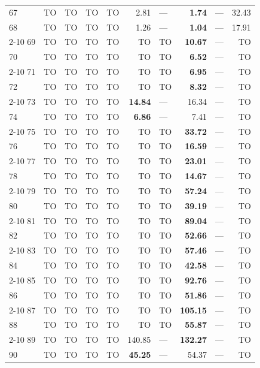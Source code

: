 \begin{longtable}{lr@{\hskip 4pt}l@{\hskip 12pt}r@{\hskip 4pt}l@{\hskip 12pt}r@{\hskip 4pt}l@{\hskip 12pt}r@{\hskip 4pt}l@{\hskip 12pt}r}
67 & TO & TO & TO & TO & 2.81 & --- & \textbf{1.74} & --- & 32.43 \\
68 & TO & TO & TO & TO & 1.26 & --- & \textbf{1.04} & --- & 17.91 \\
\cmidrule{2-10}
69 & TO & TO & TO & TO & TO & TO & \textbf{10.67} & --- & TO \\
70 & TO & TO & TO & TO & TO & TO & \textbf{6.52} & --- & TO \\
\cmidrule{2-10}
71 & TO & TO & TO & TO & TO & TO & \textbf{6.95} & --- & TO \\
72 & TO & TO & TO & TO & TO & TO & \textbf{8.32} & --- & TO \\
\cmidrule{2-10}
73 & TO & TO & TO & TO & \textbf{14.84} & --- & 16.34 & --- & TO \\
74 & TO & TO & TO & TO & \textbf{6.86} & --- & 7.41 & --- & TO \\
\cmidrule{2-10}
75 & TO & TO & TO & TO & TO & TO & \textbf{33.72} & --- & TO \\
76 & TO & TO & TO & TO & TO & TO & \textbf{16.59} & --- & TO \\
\cmidrule{2-10}
77 & TO & TO & TO & TO & TO & TO & \textbf{23.01} & --- & TO \\
78 & TO & TO & TO & TO & TO & TO & \textbf{14.67} & --- & TO \\
\cmidrule{2-10}
79 & TO & TO & TO & TO & TO & TO & \textbf{57.24} & --- & TO \\
80 & TO & TO & TO & TO & TO & TO & \textbf{39.19} & --- & TO \\
\cmidrule{2-10}
81 & TO & TO & TO & TO & TO & TO & \textbf{89.04} & --- & TO \\
82 & TO & TO & TO & TO & TO & TO & \textbf{52.66} & --- & TO \\
\cmidrule{2-10}
83 & TO & TO & TO & TO & TO & TO & \textbf{57.46} & --- & TO \\
84 & TO & TO & TO & TO & TO & TO & \textbf{42.58} & --- & TO \\
\cmidrule{2-10}
85 & TO & TO & TO & TO & TO & TO & \textbf{92.76} & --- & TO \\
86 & TO & TO & TO & TO & TO & TO & \textbf{51.86} & --- & TO \\
\cmidrule{2-10}
87 & TO & TO & TO & TO & TO & TO & \textbf{105.15} & --- & TO \\
88 & TO & TO & TO & TO & TO & TO & \textbf{55.87} & --- & TO \\
\cmidrule{2-10}
89 & TO & TO & TO & TO & 140.85 & --- & \textbf{132.27} & --- & TO \\
90 & TO & TO & TO & TO & \textbf{45.25} & --- & 54.37 & --- & TO \\

\end{longtable}
